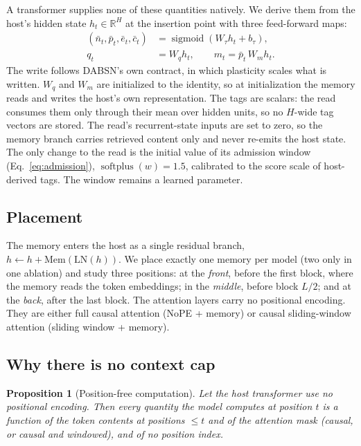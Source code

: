 \documentclass[11pt]{article}
\newtheorem{proposition}{Proposition}
\newcommand{\R}{\mathbb R}
\newcommand{\sg}{\operatorname{sigmoid}}
\newcommand{\spplus}{\operatorname{softplus}}
\begin{document}
A transformer supplies none of these quantities natively. We derive them from the
host's hidden state $h_t\in\R^H$ at the insertion point with three feed-forward
maps:
\begin{align}
(\bar n_t,\bar p_t,\bar e_t,\bar c_t) &= \sg(W_\tau h_t+b_\tau),\\
q_t &= W_q h_t, \qquad m_t = \bar p_t\, W_m h_t.
\end{align}
The write follows DABSN's own contract, in which plasticity scales what is
written. $W_q$ and $W_m$ are initialized to the identity, so at initialization
the memory reads and writes the host's own representation. The tags are scalars:
the read consumes them only through their mean over hidden units, so no
$H$-wide tag vectors are stored. The read's recurrent-state inputs are set to zero,
so the memory branch carries retrieved content only and never re-emits the host
state. The only change to the read is the initial value of its admission window
(Eq.~\ref{eq:admission}), $\spplus(w)=1.5$, calibrated to the score scale of
host-derived tags. The window remains a learned parameter.

\subsection{Placement}

The memory enters the host as a single residual branch,
$h \leftarrow h + \mathrm{Mem}(\mathrm{LN}(h))$. We place exactly one memory per model
(two only in one ablation) and study three positions: at the \emph{front}, before the first block, where the
memory reads the token embeddings; in the \emph{middle}, before block $L/2$; and at
the \emph{back}, after the last block. The attention layers carry no positional
encoding. They are either full causal attention (NoPE + memory) or causal
sliding-window attention (sliding window + memory).

\subsection{Why there is no context cap}

\begin{proposition}[Position-free computation]
\label{prop:free}
Let the host transformer use no positional encoding. Then every quantity the
model computes at position $t$ is a function of the token contents at positions
$\le t$ and of the attention mask (causal, or causal and windowed), and of no
position index.
\end{proposition}
\end{document}
